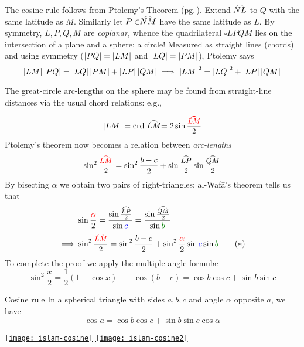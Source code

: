 The cosine rule follows from Ptolemy's Theorem (pg.\,\pageref{pg:ptolemythm}). Extend $\arc{NL}$ to $Q$ with the same latitude as $M$. Similarly let $P\in \arc{NM}$ have the same latitude as $L$. By symmetry, $L,P,Q,M$ are \emph{coplanar,} whence the quadrilateral $\square LPQM$ lies on the intersection of a plane and a sphere: a circle! Measured as straight lines (chords) and using symmetry ($\left| PQ\right|=\left| LM\right|$ and $\left| LQ\right|=\left| PM\right|$), Ptolemy says
\[
	\left| LM\right|\left| PQ\right| =\left| LQ\right|\left| PM\right|+\left| LP\right|\left| QM\right| 
	\implies \left| LM\right|^2=\left| LQ\right|^2+\left| LP\right|\left| QM\right|
\]
\goodbreak

The great-circle arc-lengths on the sphere may be found from straight-line distances via the usual chord relations: e.g.,\par
\begin{minipage}[t]{0.67\linewidth}\vspace{-12pt}
	\def\halffrac#1{\scalebox{0.9}{$\displaystyle\frac{#1}{2}$}}
	\[
		\nm{LM}=\crd\arc{LM} =2\sin\halffrac{\textcolor{red}{\arc{LM}}}
	\]
	Ptolemy's theorem now becomes a relation between \emph{arc-lengths}
	\[
		\sin^2\halffrac{\textcolor{red}{\arc{LM}}}
		=\sin^2\frac{b-c}2 +\sin\halffrac{\arc{LP}}\sin\halffrac{\arc{QM}}
	\]
	By bisecting $\alpha$ we obtain two pairs of right-triangles; al-Wafā's theorem tells us that
	\begin{align*}
		&\sin\frac{\textcolor{red}{\alpha}}2 
		=\frac{\sin\frac{\arc{LP}}2}{\sin\textcolor{blue}{c}}
		=\frac{\sin\frac{\arc{QM}}2}{\sin\textcolor{Green}{b}}\\[3pt]
		\implies
		&\sin^2\halffrac{\textcolor{red}{\arc{LM}}}
		=\sin^2\frac{b-c}2 +\sin^2\frac{\textcolor{red}{\alpha}}2 \sin\textcolor{blue}{c} \sin\textcolor{Green}{b}\tag*{($\ast$)}
	\end{align*}
	To complete the proof we apply the multiple-angle formulæ
	\[
		\sin^2\frac x2=\frac 12(1-\cos x)\qquad
		\cos(b-c)=\cos b\cos c+\sin b\sin c
	\]

	\begin{cor*}{Cosine rule}{}
	In a spherical triangle with sides $a,b,c$ and angle $\alpha$ opposite $a$, we have
	\[
		\cos a=\cos b\cos c+\sin b\sin c\cos\alpha
	\]
	\end{cor*}
\end{minipage}
\hfill
\begin{minipage}[t]{0.32\linewidth}\vspace{0pt}
	\flushright{}\label{pg:qiblacosinerule}
	\href{http://math.uci.edu/~ndonalds/math184/islam-cosine.html}{\texttt{[image: islam-cosine]}}
	\bigbreak
	\href{http://math.uci.edu/~ndonalds/math184/islam-cosine2.html}{\texttt{[image: islam-cosine2]}}
\end{minipage}
\bigbreak

